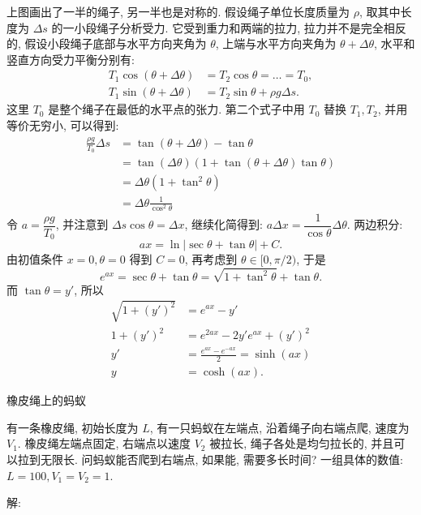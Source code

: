 上图画出了一半的绳子, 另一半也是对称的. 假设绳子单位长度质量为 $ \rho $, 取其中长度为 $ \Delta s $ 的一小段绳子分析受力. 它受到重力和两端的拉力, 拉力并不是完全相反的, 假设小段绳子底部与水平方向夹角为 $ \theta $, 上端与水平方向夹角为 $ \theta + \Delta\theta $, 水平和竖直方向受力平衡分别有:
\begin{align*}
T_1\cos(\theta+\Delta\theta) &= T_2\cos\theta =\ldots=T_0,\\
T_1\sin(\theta+\Delta\theta) &= T_2\sin\theta + \rho g \Delta s .
\end{align*}
这里 $ T_0 $ 是整个绳子在最低的水平点的张力. 第二个式子中用 $ T_0 $ 替换 $ T_1, T_2 $, 并用等价无穷小, 可以得到:
\begin{align*}
\frac{\rho g}{T_0 } \Delta s &= \tan(\theta + \Delta \theta) - \tan \theta \\
 &= \tan(\Delta\theta)(1+\tan(\theta+\Delta\theta)\tan\theta) \\
 &= \Delta\theta (1 + \tan^2\theta)\\
 &= \Delta\theta \frac{1}{\cos^2\theta}%
\end{align*}
令 $ a = \dfrac{\rho g}{T_0 } $, 并注意到 $ \Delta s \cos\theta = \Delta x $, 继续化简得到: $ a\Delta x = \dfrac{1}{\cos\theta} \Delta\theta $. 两边积分: 
\[ ax = \ln | \sec\theta + \tan\theta | + C. \]
由初值条件 $ x = 0, \theta = 0 $ 得到 $ C = 0 $, 再考虑到 $ \theta\in[0,\pi/2) $, 于是
\[ e^{ax} = \sec\theta + \tan\theta = \sqrt{1+\tan^2\theta} + \tan\theta. \]
而 $ \tan\theta = y' $, 所以
\begin{align*}
\sqrt{1+(y')^2} &= e^{ax}-y' \\
1+(y')^2 &= e^{2ax} - 2y'e^{ax} + (y')^2 \\
y' &= \frac{e^{ax}-e^{-ax}}{2} = \sinh(ax) \\
y &= \cosh(ax).
\end{align*}


\newpage

\noindent 橡皮绳上的蚂蚁

有一条橡皮绳, 初始长度为 $L$, 有一只蚂蚁在左端点, 沿着绳子向右端点爬, 速度为 $ V_1 $. 橡皮绳左端点固定, 右端点以速度 $ V_2 $ 被拉长, 绳子各处是均匀拉长的, 并且可以拉到无限长. 问蚂蚁能否爬到右端点, 如果能, 需要多长时间? 一组具体的数值: $ L = 100, V_1=V_2=1 $.

\noindent 解:

